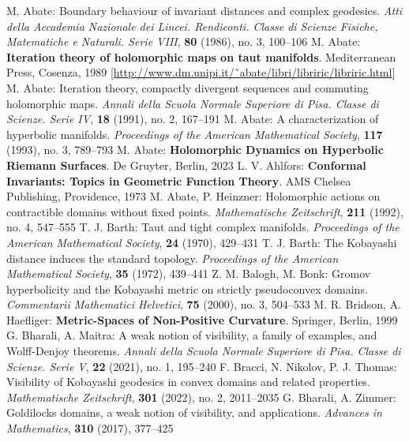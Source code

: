 \begin{thebibliography}{widest entry}
   M. Abate: Boundary behaviour of invariant distances and complex geodesics. \textit{Atti della Accademia Nazionale dei Lincei. Rendiconti. Classe di Scienze Fisiche, Matematiche e Naturali. Serie VIII}, \textbf{80} (1986), no. 3, 100--106
   M. Abate: \textbf{Iteration theory of holomorphic maps on taut manifolds}. Mediterranean Press, Cosenza, 1989 [\url{http://www.dm.unipi.it/˜abate/libri/libriric/libriric.html}]
   M. Abate: Iteration theory, compactly divergent sequences and commuting holomorphic maps. \textit{Annali della Scuola Normale Superiore di Pisa. Classe di Scienze. Serie IV}, \textbf{18} (1991), no. 2, 167--191
   M. Abate: A characterization of hyperbolic manifolds. \textit{Proceedings of the American Mathematical Society}, \textbf{117} (1993), no. 3, 789--793
   M. Abate: \textbf{Holomorphic Dynamics on Hyperbolic Riemann Surfaces}. De Gruyter, Berlin, 2023
   L. V. Ahlfors: \textbf{Conformal Invariants: Topics in Geometric Function Theory}. AMS Chelsea Publishing, Providence, 1973
   M. Abate, P. Heinzner: Holomorphic actions on contractible domains without fixed points. \textit{Mathematische Zeitschrift}, \textbf{211} (1992), no. 4, 547--555
   T. J. Barth: Taut and tight complex manifolds. \textit{ Proceedings of the American Mathematical Society}, \textbf{24} (1970), 429--431
   T. J. Barth: The Kobayashi distance induces the standard topology. \textit{Proceedings of the American Mathematical Society}, \textbf{35} (1972), 439--441
   Z. M. Balogh, M. Bonk: Gromov hyperbolicity and the Kobayashi metric on strictly pseudoconvex domains. \textit{Commentarii Mathematici Helvetici}, \textbf{75} (2000), no. 3, 504--533
   M. R. Bridson, A. Haefliger: \textbf{Metric-Spaces of Non-Positive Curvature}. Springer, Berlin, 1999
   G. Bharali, A. Maitra: A weak notion of visibility, a family of examples, and Wolff-Denjoy theorems. \textit{Annali della Scuola Normale Superiore di Pisa. Classe di Scienze. Serie V}, \textbf{22} (2021), no. 1, 195--240
   F. Bracci, N. Nikolov, P. J. Thomas: Visibility of Kobayashi geodesics in convex domains and related properties. \textit{Mathematische Zeitschrift}, \textbf{301} (2022), no. 2, 2011--2035
   G. Bharali, A. Zimmer: Goldilocks domains, a weak notion of visibility, and applications. \textit{Advances in Mathematics}, \textbf{310} (2017), 377--425

\end{thebibliography}
